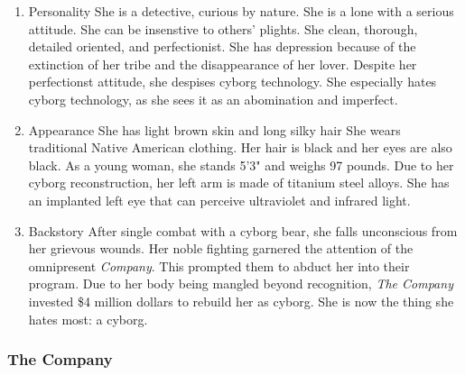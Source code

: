 \documentclass[11pt]{article}
\begin{document}
\begin{enumerate}
\item Personality
\label{sec:orgfe5d8df}
She is a detective, curious by nature. She is a lone with a serious attitude. She can be insenstive to others' plights. She clean, thorough, detailed oriented, and perfectionist. She has depression because of the extinction of her tribe and the disappearance of her lover. Despite her perfectionst attitude, she despises cyborg technology. She especially hates cyborg technology, as she sees it as an abomination and imperfect.

\item Appearance
\label{sec:orgab7f6a8}
She has light brown skin and long silky hair She wears traditional Native American clothing. Her hair is black and her eyes are also black. As a young woman, she stands 5'3" and weighs 97 pounds. Due to her cyborg reconstruction, her left arm is made of titanium steel alloys. She has an implanted left eye that can perceive ultraviolet and infrared light.

\item Backstory
\label{sec:orgafb0c32}
After single combat with a cyborg bear, she falls unconscious from her grievous wounds. Her noble fighting garnered the attention of the omnipresent \emph{Company}. This prompted them to abduct her into their program. Due to her body being mangled beyond recognition, \emph{The Company} invested \$4 million dollars to rebuild her as cyborg. She is now the thing she hates most: a cyborg.
\end{enumerate}

\subsubsection{The Company}
\label{sec:org8ef1938}
\end{document}
